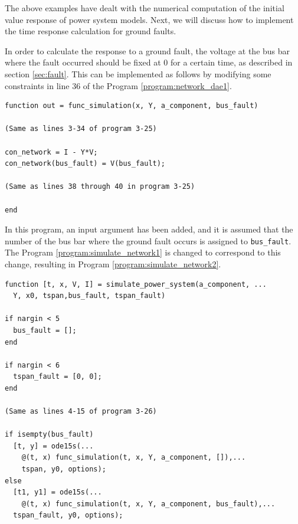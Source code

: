 \documentclass[tombow,dvipdfmx]{corona-a5-1.1}
\begin{document}
The above examples have dealt with the numerical computation of the initial value response of power system models.
Next, we will discuss how to implement the time response calculation for ground faults.

\begin{例}
In order to calculate the response to a ground fault, the voltage at the bus bar where the fault occurred should be fixed at $0$ for a certain time, as described in section \ref{sec:fault}.
This can be implemented as follows by modifying some constraints in line 36 of the Program \nobreak\ref{program:network_dae1}.

\smallskip
\begin{PROGRAMA}[count,title={func\_simulation.m}]\label{program:network_dae_fault}
\begin{verbatim}
function out = func_simulation(x, Y, a_component, bus_fault)

(Same as lines 3-34 of program 3-25)

con_network = I - Y*V;
con_network(bus_fault) = V(bus_fault);

(Same as lines 38 through 40 in program 3-25)

end
\end{verbatim}
\end{PROGRAMA}

In this program, an input argument has been added, and it is assumed that the number of the bus bar where the ground fault occurs is assigned to \verb|bus_fault|.
The Program \nobreak\ref{program:simulate_network1} is changed to correspond to this change, resulting in Program \ref{program:simulate_network2}.

\smallskip
\begin{PROGRAMA}[count,title={simulate\_power\_system.m}]\label{program:simulate_network2}
  \begin{verbatim}
function [t, x, V, I] = simulate_power_system(a_component, ...
  Y, x0, tspan,bus_fault, tspan_fault)

if nargin < 5
  bus_fault = [];
end

if nargin < 6
  tspan_fault = [0, 0];
end

(Same as lines 4-15 of program 3-26)

if isempty(bus_fault)
  [t, y] = ode15s(...
    @(t, x) func_simulation(t, x, Y, a_component, []),...
    tspan, y0, options);
else
  [t1, y1] = ode15s(...
    @(t, x) func_simulation(t, x, Y, a_component, bus_fault),...
  tspan_fault, y0, options);
  

\end{verbatim}
\end{PROGRAMA}
\end{例}
\end{document}
